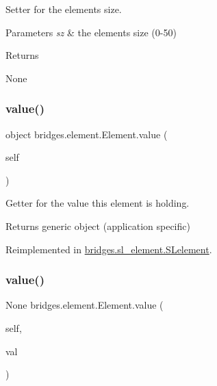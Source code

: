 Setter for the element\textquotesingle{}s size. 


\begin{DoxyParams}{Parameters}
{\em sz} & the element\textquotesingle{}s size (0-\/50) \\
\hline
\end{DoxyParams}
\begin{DoxyReturn}{Returns}


None 
\end{DoxyReturn}
\mbox{\label{classbridges_1_1element_1_1_element_ad18e8738e025d7af322144aecbec1629}} 
\subsubsection{\texorpdfstring{value()}{value()}\hspace{0.1cm}{\footnotesize\ttfamily [1/2]}}
{\footnotesize\ttfamily  object bridges.\+element.\+Element.\+value (\begin{DoxyParamCaption}\item[{}]{self }\end{DoxyParamCaption})}



Getter for the value this element is holding. 

\begin{DoxyReturn}{Returns}
generic object (application specific) 
\end{DoxyReturn}


Reimplemented in \mbox{\hyperlink{classbridges_1_1sl__element_1_1_s_lelement_a64ede02c56a4efaaa4c64a245bd01dd0}{bridges.\+sl\+\_\+element.\+S\+Lelement}}.

\mbox{\label{classbridges_1_1element_1_1_element_ab2b6e30e1c3443ddde043b919e1d7ef5}} 
\subsubsection{\texorpdfstring{value()}{value()}\hspace{0.1cm}{\footnotesize\ttfamily [2/2]}}
{\footnotesize\ttfamily  None bridges.\+element.\+Element.\+value (\begin{DoxyParamCaption}\item[{}]{self,  }\item[{}]{val }\end{DoxyParamCaption})}




